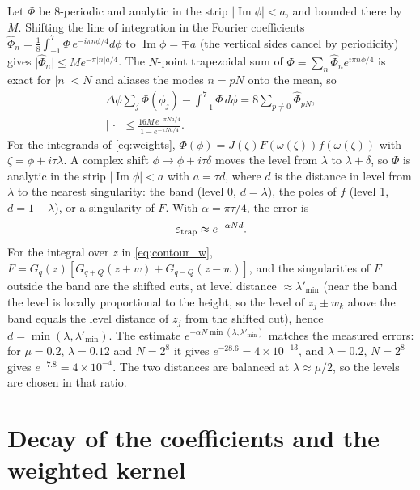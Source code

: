 \documentclass[aps,prb,reprint,a4paper]{revtex4-2}
\DeclareMathOperator{\Imag}{Im}
\begin{document}
Let $\Phi$ be 8-periodic and analytic in the strip $\lvert\Imag\phi\rvert<a$, and bounded there by $M$. Shifting the line of integration in the Fourier coefficients $\hat\Phi_n=\frac18\int_{-1}^7\Phi\,e^{-i\pi n\phi/4}d\phi$ to $\Imag\phi=\mp a$ (the vertical sides cancel by periodicity) gives $\lvert\hat\Phi_n\rvert\le Me^{-\pi\lvert n\rvert a/4}$. The $N$-point trapezoidal sum of $\Phi=\sum_n\hat\Phi_ne^{i\pi n\phi/4}$ is exact for $\lvert n\rvert<N$ and aliases the modes $n=pN$ onto the mean, so
\begin{equation}
  \begin{gathered}
  \Delta\phi\sum_j\Phi(\phi_j)-\int_{-1}^{7}\Phi\,d\phi=8\sum_{p\ne0}\hat\Phi_{pN},\\
  \Big\lvert\,\cdot\,\Big\rvert\le\frac{16M\,e^{-\pi Na/4}}{1-e^{-\pi Na/4}} .
  \end{gathered}
  \label{eq:trap_error}
\end{equation}
For the integrands of \eqref{eq:weights}, $\Phi(\phi)=J(\zeta)F(\omega(\zeta))f(\omega(\zeta))$ with $\zeta=\phi+i\tau\lambda$. A complex shift $\phi\to\phi+i\tau\delta$ moves the level from $\lambda$ to $\lambda+\delta$, so $\Phi$ is analytic in the strip $\lvert\Imag\phi\rvert<a$ with $a=\tau d$, where $d$ is the distance in level from $\lambda$ to the nearest singularity: the band (level 0, $d=\lambda$), the poles of $f$ (level 1, $d=1-\lambda$), or a singularity of $F$. With $\alpha=\pi\tau/4$, the error is
\begin{equation}
  \varepsilon_{\rm trap}\approx e^{-\alpha Nd}.
  \label{eq:rate}
\end{equation}
For the integral over $z$ in \eqref{eq:contour_w}, $F=G_q(z)[G_{q+Q}(z+w)+G_{q-Q}(z-w)]$, and the singularities of $F$ outside the band are the shifted cuts, at level distance $\approx\lambda'_{\min}$ (near the band the level is locally proportional to the height, so the level of $z_j\pm w_k$ above the band equals the level distance of $z_j$ from the shifted cut), hence $d=\min(\lambda,\lambda'_{\min})$. The estimate $e^{-\alpha N\min(\lambda,\lambda'_{\min})}$ matches the measured errors: for $\mu=0.2$, $\lambda=0.12$ and $N=2^8$ it gives $e^{-28.6}=4\times10^{-13}$, and $\lambda=0.2$, $N=2^8$ gives $e^{-7.8}=4\times10^{-4}$. The two distances are balanced at $\lambda\approx\mu/2$, so the levels are chosen in that ratio.

\section{Decay of the coefficients and the weighted kernel}
\label{sec:decay}
\end{document}
